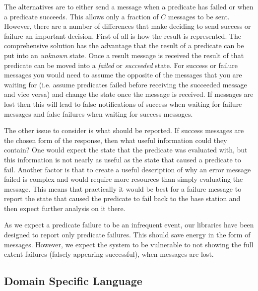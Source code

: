 The alternatives are to either send a message when a predicate has failed or when a predicate succeeds. This allows only a fraction of $C$ messages to be sent. However, there are a number of differences that make deciding to send success or failure an important decision. First of all is how the result is represented. The comprehensive solution has the advantage that the result of a predicate can be put into an \emph{unknown} state. Once a result message is received the result of that predicate can be moved into a \emph{failed} or \emph{succeeded} state. For success or failure messages you would need to assume the opposite of the messages that you are waiting for (i.e. assume predicates failed before receiving the succeeded message and vice versa) and change the state once the message is received. If messages are lost then this will lead to false notifications of success when waiting for failure messages and false failures when waiting for success messages.

The other issue to consider is what should be reported. If success messages are the chosen form of the response, then what useful information could they contain? One would expect the state that the predicate was evaluated with, but this information is not nearly as useful as the state that caused a predicate to fail. Another factor is that to create a useful description of why an error message failed is complex and would require more resources than simply evaluating the message. This means that practically it would be best for a failure message to report the state that caused the predicate to fail back to the base station and then expect further analysis on it there.

As we expect a predicate failure to be an infrequent event, our libraries have been designed to report only predicate failures. This should save energy in the form of messages. However, we expect the system to be vulnerable to not showing the full extent failures (falsely appearing successful), when messages are lost.


\subsection{Domain Specific Language}

